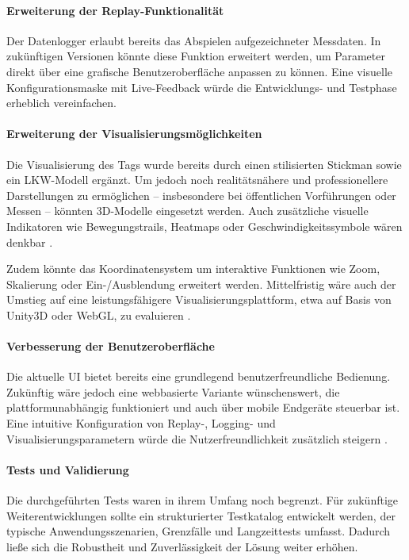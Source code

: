 \documentclass[a4paper, 12pt]{article} %
\begin{document}
\paragraph{Erweiterung der Replay-Funktionalität}
Der Datenlogger erlaubt bereits das Abspielen aufgezeichneter Messdaten. In zukünftigen Versionen könnte diese Funktion erweitert werden, um Parameter 
direkt über eine grafische Benutzeroberfläche anpassen zu können. Eine visuelle Konfigurationsmaske mit Live-Feedback würde die Entwicklungs- und 
Testphase erheblich vereinfachen.

\paragraph{Erweiterung der Visualisierungsmöglichkeiten}
Die Visualisierung des Tags wurde bereits durch einen stilisierten Stickman sowie ein \ac{LKW}-Modell ergänzt. Um jedoch noch realitätsnähere und
professionellere Darstellungen zu ermöglichen – insbesondere bei öffentlichen Vorführungen oder Messen – könnten 3D-Modelle eingesetzt werden. 
Auch zusätzliche visuelle Indikatoren wie Bewegungstrails, Heatmaps oder Geschwindigkeitssymbole wären denkbar \cite{unity_visualization}.

Zudem könnte das Koordinatensystem um interaktive Funktionen wie Zoom, Skalierung oder Ein-/Ausblendung erweitert werden. Mittelfristig wäre auch 
der Umstieg auf eine leistungsfähigere Visualisierungsplattform, etwa auf Basis von Unity3D oder WebGL, zu evaluieren \cite{webgl_book}.

\paragraph{Verbesserung der Benutzeroberfläche}
Die aktuelle \ac{UI} bietet bereits eine grundlegend benutzerfreundliche Bedienung. Zukünftig wäre jedoch eine webbasierte Variante wünschenswert, 
die plattformunabhängig funktioniert und auch über mobile Endgeräte steuerbar ist. Eine intuitive Konfiguration von Replay-, Logging- und 
Visualisierungsparametern würde die Nutzerfreundlichkeit zusätzlich steigern \cite{ux_design_book}.

\paragraph{Tests und Validierung}
Die durchgeführten Tests waren in ihrem Umfang noch begrenzt. Für zukünftige Weiterentwicklungen sollte ein strukturierter Testkatalog 
entwickelt werden, der typische Anwendungsszenarien, Grenzfälle und Langzeittests umfasst. Dadurch ließe sich die Robustheit und Zuverlässigkeit 
der Lösung weiter erhöhen.
\end{document}
